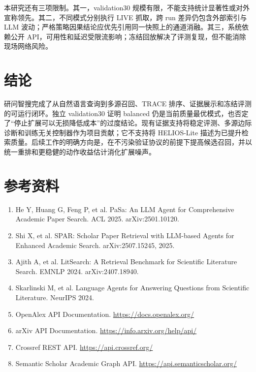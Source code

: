 \documentclass[a4paper,11pt]{ctexart}
\begin{document}
本研究还有三项限制。其一，validation30 规模有限，不能支持统计显著性或对外宣称领先。其二，不同模式分别执行 LIVE 抓取，跨 run 差异仍包含外部索引与 LLM 波动；严格策略因果结论应优先引用同一快照上的通道消融。其三，系统依赖公开 API，可用性和延迟受限流影响；冻结回放解决了评测复现，但不能消除现场网络风险。

\section{结论}
研问智搜完成了从自然语言查询到多源召回、TRACE 排序、证据展示和冻结评测的可运行闭环。独立 validation30 证明 balanced 仍是当前质量最优模式，也否定了“停止扩展可以无损降低成本”的过度结论。现有证据支持将稳定评测、多源边际诊断和训练无关控制器作为项目贡献；它不支持将 HELIOS-Lite 描述为已提升检索质量。后续工作的明确方向是，在不污染验证协议的前提下提高候选召回，并以统一重排和更稳健的动作收益估计消化扩展噪声。

\section*{参考资料}
\begin{enumerate}[leftmargin=2em]
\item He Y, Huang G, Feng P, et al. PaSa: An LLM Agent for Comprehensive Academic Paper Search. ACL 2025. arXiv:2501.10120.
\item Shi X, et al. SPAR: Scholar Paper Retrieval with LLM-based Agents for Enhanced Academic Search. arXiv:2507.15245, 2025.
\item Ajith A, et al. LitSearch: A Retrieval Benchmark for Scientific Literature Search. EMNLP 2024. arXiv:2407.18940.
\item Skarlinski M, et al. Language Agents for Answering Questions from Scientific Literature. NeurIPS 2024.
\item OpenAlex API Documentation. \url{https://docs.openalex.org/}
\item arXiv API Documentation. \url{https://info.arxiv.org/help/api/}
\item Crossref REST API. \url{https://api.crossref.org/}
\item Semantic Scholar Academic Graph API. \url{https://api.semanticscholar.org/}
\end{enumerate}
\end{document}
